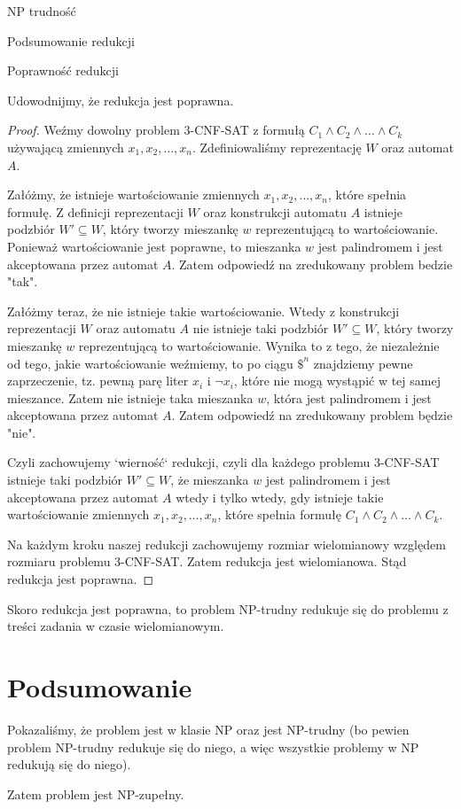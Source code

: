 \documentclass{article}
\theoremstyle{definition}
\theoremstyle{remark}
\begin{document}
\begin{section}{NP trudność}
\begin{subsection}{Podsumowanie redukcji}
 \end{subsection}

 \begin{subsection}{Poprawność redukcji}

     Udowodnijmy, że redukcja jest poprawna.

     \begin{proof}

         Weźmy dowolny problem 3-CNF-SAT z formułą $C_1 \land C_2 \land \ldots \land
             C_k$ używającą zmiennych $x_1, x_2, \ldots, x_n$. Zdefiniowaliśmy reprezentację
         $W$ oraz automat $A$.

         Załóżmy, że istnieje wartościowanie zmiennych $x_1, x_2, \ldots, x_n$, które
         spełnia formułę. Z definicji reprezentacji $W$ oraz konstrukcji automatu $A$
         istnieje podzbiór $W' \subseteq W$, który tworzy mieszankę $w$ reprezentującą
         to wartościowanie. Ponieważ wartościowanie jest poprawne, to mieszanka $w$ jest
         palindromem i jest akceptowana przez automat $A$. Zatem odpowiedź na
         zredukowany problem bedzie "tak".

         Załóżmy teraz, że nie istnieje takie wartościowanie. Wtedy z konstrukcji
         reprezentacji $W$ oraz automatu $A$ nie istnieje taki podzbiór $W' \subseteq
             W$, który tworzy mieszankę $w$ reprezentującą to wartościowanie. Wynika to z
         tego, że niezależnie od tego, jakie wartościowanie weźmiemy, to po ciągu $ \$^n
         $ znajdziemy pewne zaprzeczenie, tz. pewną parę liter $ x_i $ i $ \neg x_i $,
         które nie mogą wystąpić w tej samej mieszance. Zatem nie istnieje taka
         mieszanka $w$, która jest palindromem i jest akceptowana przez automat $A$.
         Zatem odpowiedź na zredukowany problem będzie "nie".

         Czyli zachowujemy `wierność` redukcji, czyli dla każdego problemu 3-CNF-SAT
         istnieje taki podzbiór $W' \subseteq W$, że mieszanka $w$ jest palindromem i
         jest akceptowana przez automat $A$ wtedy i tylko wtedy, gdy istnieje takie
         wartościowanie zmiennych $x_1, x_2, \ldots, x_n$, które spełnia formułę $C_1
             \land C_2 \land \ldots \land C_k$.

         Na każdym kroku naszej redukcji zachowujemy rozmiar wielomianowy względem
         rozmiaru problemu 3-CNF-SAT. Zatem redukcja jest wielomianowa. Stąd redukcja
         jest poprawna.

     \end{proof}

 \end{subsection}

 Skoro redukcja jest poprawna, to problem NP-trudny redukuje się do problemu z
 treści zadania w czasie wielomianowym.

\end{section}

\section {Podsumowanie}

Pokazaliśmy, że problem jest w klasie NP oraz jest NP-trudny (bo pewien problem
NP-trudny redukuje się do niego, a więc wszystkie problemy w NP redukują się do
niego).

Zatem problem jest NP-zupełny.
\end{document}
